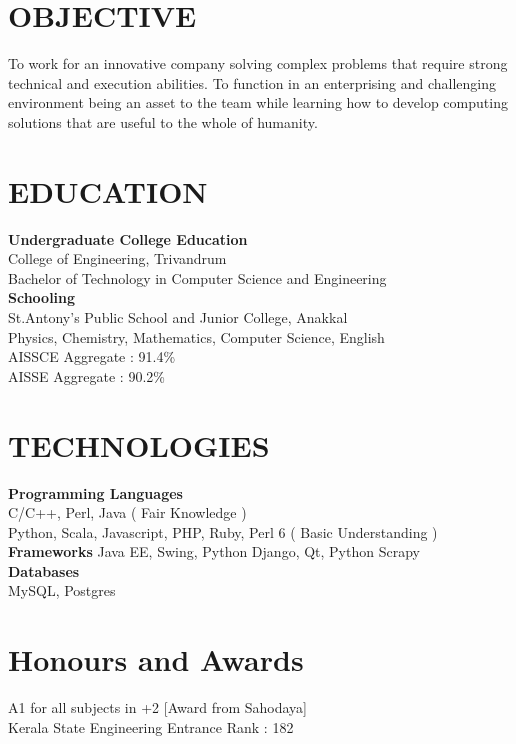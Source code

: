 \documentclass[line,margin]{res}
\begin{document}


\address{joji\_antony@gmx.com}
\address{+91 96323 41954}

\begin{resume}
\section{OBJECTIVE}
To work for an innovative company solving complex problems that require strong technical and execution abilities. To function in an enterprising and challenging environment being an asset to the team while learning how to develop computing solutions that are useful to the whole of humanity.\\

\section{EDUCATION}

{\bf Undergraduate College Education}\\
College of Engineering, Trivandrum\\
Bachelor of Technology in Computer Science and Engineering\\

{\bf Schooling} \\
St.Antony's Public School and Junior College, Anakkal\\
Physics, Chemistry, Mathematics, Computer Science, English\\

AISSCE Aggregate : 91.4\%\\
AISSE Aggregate : 90.2\%\\

\section{TECHNOLOGIES}
{\bf Programming Languages}\\
C/C++, Perl, Java ( Fair Knowledge )\\
Python, Scala, Javascript, PHP, Ruby, Perl 6 ( Basic Understanding )\\

{\bf Frameworks}
Java EE, Swing, Python Django, Qt, Python Scrapy\\

{\bf Databases}\\
MySQL, Postgres\\

\section{Honours and Awards}
A1 for all subjects in +2  [Award from Sahodaya]\\
Kerala State Engineering Entrance Rank : 182\\


\end{resume}
\end{document}
